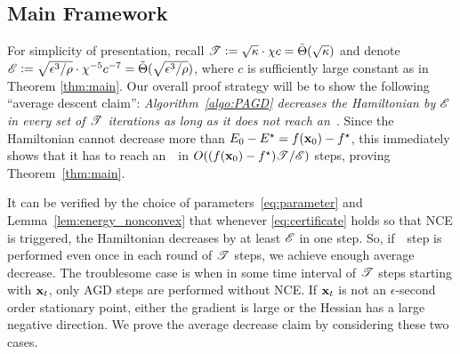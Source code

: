
\subsection{Main Framework} \label{sec:framework}
For simplicity of presentation, recall $\mathscr{T} \mathrel{\mathop:}= \sqrt{\kappa} \cdot \chi c = \tilde{\Theta}(\sqrt{\kappa})$ and denote $\mathscr{E} \mathrel{\mathop:}= \sqrt{\epsilon^3/\rho}\cdot \chi^{-5}c^{-7} = \tilde{\Theta}(\sqrt{\epsilon^3/\rho})$, where $c$ is sufficiently large constant as in Theorem \ref{thm:main}. Our overall proof strategy will be to show the following ``average descent claim'':
\emph{Algorithm~\ref{algo:PAGD} decreases the Hamiltonian by $\mathscr{E}$ in every set of $\mathscr{T}$ iterations as long as it does not reach an~\ESSP}.
Since the Hamiltonian cannot decrease more than $E_0 - E^\star = f(\mathbf{x}_0) - f^\star$, this immediately shows that it has to reach an~\ESSP~in $O((f(\mathbf{x}_0) - f^\star)\mathscr{T}/\mathscr{E})$ steps, proving Theorem~\ref{thm:main}.

It can be verified by the choice of parameters~\eqref{eq:parameter} and Lemma~\ref{lem:energy_nonconvex} that whenever \eqref{eq:certificate} holds so that NCE is triggered, the Hamiltonian decreases by at least $\mathscr{E}$ in one step.
So, if~\nce~step is performed even once in each round of $\mathscr{T}$ steps, we achieve enough average decrease. The troublesome case is when in some time interval of $\mathscr{T}$ steps starting with $\mathbf{x}_t$, only AGD steps are performed without NCE.
If $\mathbf{x}_t$ is not an $\epsilon$-second order stationary point, either the gradient is large or the Hessian has a large negative direction. We prove the average decrease claim by considering these two cases.

